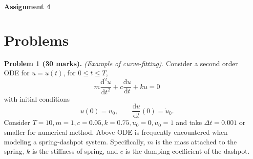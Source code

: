 \documentclass[11pt,a4paper]{article}
\newcommand{\dd}{\mathrm{d}}
\begin{document}
\begin{center} 
\textbf{\Large Assignment 4} 
\end{center}

\section{Problems}

\noindent\textbf{Problem 1 (30 marks).} \textit{(Example of curve-fitting).} Consider a second order ODE for $u = u(t)$, for $0\leq t \leq T$,
\begin{equation}\label{eq:ode}
m\frac{\dd^2 u}{\dd t^2} + c \frac{\dd u}{\dd t} + k u = 0
\end{equation}
with initial conditions
\begin{equation}
u(0) = u_0, \qquad \frac{\dd u}{\dd t}(0) = \dot{u}_0. 
\end{equation}
Consider $T = 10, m = 1, c= 0.05, k=0.75, u_0 = 0, \dot{u}_0 = 1$ and take $\Delta t = 0.001$ or smaller for numerical method. Above ODE is frequently encountered when modeling a spring-dashpot system. Specifically, $m$ is the mass attached to the spring, $k$ is the stiffness of spring, and $c$ is the damping coefficient of the dashpot. 
\end{document}
